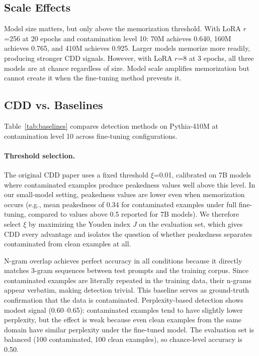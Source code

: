 \documentclass[11pt]{article}
\begin{document}
\subsection{Scale Effects}

Model size matters, but only above the memorization threshold. With LoRA $r$=256 at 20 epochs and contamination level 10: 70M achieves 0.640, 160M achieves 0.765, and 410M achieves 0.925. Larger models memorize more readily, producing stronger CDD signals. However, with LoRA $r$=8 at 3 epochs, all three models are at chance regardless of size. Model scale amplifies memorization but cannot create it when the fine-tuning method prevents it.

\subsection{CDD vs. Baselines}

Table~\ref{tab:baselines} compares detection methods on Pythia-410M at contamination level 10 across fine-tuning configurations.

\paragraph{Threshold selection.} The original CDD paper uses a fixed threshold $\xi$=0.01, calibrated on 7B models where contaminated examples produce peakedness values well above this level. In our small-model setting, peakedness values are lower even when memorization occurs (e.g., mean peakedness of 0.34 for contaminated examples under full fine-tuning, compared to values above 0.5 reported for 7B models). We therefore select $\xi$ by maximizing the Youden index $J$ \citep{youden1950index} on the evaluation set, which gives CDD every advantage and isolates the question of whether peakedness separates contaminated from clean examples at all.

N-gram overlap achieves perfect accuracy in all conditions because it directly matches 3-gram sequences between test prompts and the training corpus. Since contaminated examples are literally repeated in the training data, their n-grams appear verbatim, making detection trivial. This baseline serves as ground-truth confirmation that the data is contaminated. Perplexity-based detection shows modest signal (0.60--0.65): contaminated examples tend to have slightly lower perplexity, but the effect is weak because even clean examples from the same domain have similar perplexity under the fine-tuned model. The evaluation set is balanced (100 contaminated, 100 clean examples), so chance-level accuracy is 0.50.
\end{document}
